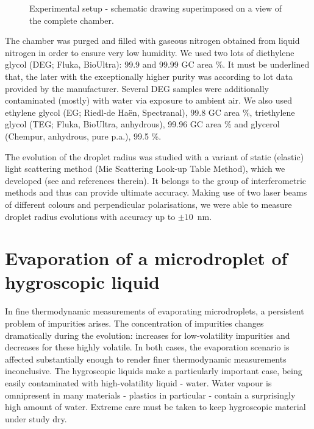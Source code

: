 \documentclass[twoside,twocolumn,9pt]{article}
\begin{document}
\begin{figure}[htb]
 \centering
 \caption{Experimental setup - schematic drawing superimposed on a view of the complete chamber.}
 \label{setup4mixed}
\end{figure}

The chamber was purged and filled with gaseous nitrogen obtained from liquid nitrogen in order to ensure very low humidity.
We used two lots of diethylene glycol (DEG; Fluka, BioUltra): 99.9 and 99.99 GC area \%. It must be underlined that, the later with the exceptionally higher purity was according to lot data provided by the manufacturer. Several DEG samples were additionally contaminated (mostly) with water via exposure to ambient air. We also used ethylene glycol (EG; Riedl-de {Ha\"{e}n}, Spectranal), 99.8 GC area \%, triethylene glycol (TEG; Fluka, BioUltra, anhydrous), 99.96 GC area \% and glycerol (Chempur, anhydrous, pure p.a.), 99.5 \%.

The evolution of the droplet radius was studied with a variant of static (elastic) light scattering method (Mie Scattering Look-up Table Method), which we developed (see \cite{Smigacz} and references therein). It belongs to the group of interferometric methods and thus can provide ultimate accuracy. Making use of two laser beams of different colours and perpendicular polarisations, we were able to measure droplet radius evolutions with accuracy up to $\pm 10$~nm. 

\section{Evaporation of a microdroplet of hygroscopic liquid}

In fine thermodynamic measurements of evaporating microdroplets, a persistent problem of impurities arises. The concentration of impurities changes dramatically during the evolution: increases for low-volatility impurities and decreases for these highly volatile. In both cases, the evaporation scenario is affected substantially enough to render finer thermodynamic measurements inconclusive. The hygroscopic liquids make a particularly important case, being easily contaminated with high-volatility liquid - water. Water vapour is omnipresent in many materials - plastics in particular - contain a surprisingly high amount of water. Extreme care must be taken to keep hygroscopic material under study dry.
\end{document}
